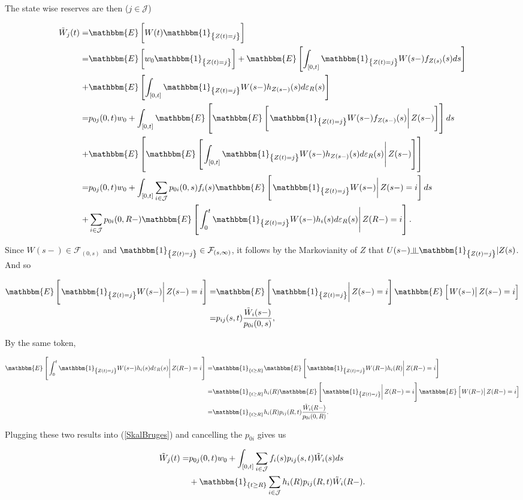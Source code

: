 \documentclass{book}
\newcommand{\indep}{\rotatebox[origin=c]{90}{$\models$}}
\newcommand{\1}[1]{\mathbbm{1}_{\left\lbrace #1 \right\rbrace}}
\newcommand{\expec}[1][def]{\mathbbm{E} \left[ #1 \right]}
\newcommand{\econd}[2][def]{\mathbbm{E} \left[ \left. #1 \right| #2 \right]}
\theoremstyle{break}
\theoremstyle{remark}
\numberwithin{equation}{section}
\begin{document}
The state wise reserves are then ($j \in \mathcal{J}$)

\begin{align} \label{SkalBruges}
	\tilde{W}_j(t) =& \expec[W(t) \1{Z(t)=j}] \nonumber \\
	=& \expec[w_0 \1{Z(t)=j}] + \expec[\int_{\left[ 0,t \right]} \1{Z(t)=j} W(s-) f_{Z(s)}(s) ds] \nonumber \\
	+& \expec[\int_{\left[ 0,t \right]} \1{Z(t)=j} W(s-) h_{Z(s-)}(s) d \varepsilon_{R}(s)] \nonumber \\
	=& p_{0j}(0,t) w_0 + \int_{\left[ 0,t \right]} \mathbbm{E} \left[ \econd[\1{Z(t)=j} W(s-) f_{Z(s-)}(s)]{Z(s-)} \right]ds \nonumber \\
	+& \mathbbm{E} \left[ \econd[ \int_{\left[ 0,t \right]} \1{Z(t)=j} W(s-) h_{Z(s-)}(s) d \varepsilon_{R}(s) ]{Z(s-)} \right] \nonumber \\
	=& p_{0j}(0,t) w_0 + \int_{\left[ 0,t \right]} \sum_{i \in \mathcal{J}} p_{0i}(0,s) f_{i}(s) \econd[\1{Z(t)=j} W(s-)]{Z(s-)=i} ds \\
	+& \sum_{i \in \mathcal{J}} p_{0i}(0,R-) \econd[\int_0^t \1{Z(t)=j} W(s-) h_{i}(s) d \varepsilon_{R}(s)]{Z(R-)=i}. \nonumber
\end{align}

Since $W(s-) \in  \mathcal{F}_{\left( 0,s \right)}$ and $\1{Z(t)=j} \in \mathcal{F}_{\left( s,\infty \right)}$, it follows by the Markovianity of $Z$ that $U(s-) \indep \1{Z(t)=j} | Z(s)$. And so 

\begin{align*}
	\econd[\1{Z(t)=j}W(s-)]{Z(s-)=i} =& \econd[\1{Z(t)=j}]{Z(s-)=i} \econd[W(s-)]{Z(s-)=i} \\
	=& p_{ij}(s,t) \frac{\tilde{W}_i(s-)}{p_{0i}(0,s)},
\end{align*}

By the same token,

\begin{align*}
	\econd[\int_0^t \1{Z(t)=j} W(s-) h_{i}(s) d \varepsilon_{R}(s)]{Z(R-)=i} =& \1{t \geq R} \econd[\1{Z(t)=j} W(R-) h_{i}(R)]{Z(R-)=i} \\
	=& \1{t \geq R} h_{i}(R) \econd[\1{Z(t)=j}]{Z(R-)=i} \econd[W(R-)]{Z(R-)=i} \\
	=& \1{t \geq R} h_{i}(R) p_{ij}(R,t) \frac{\tilde{W}_i(R-)}{p_{0i}(0,R)}.
\end{align*}

Plugging these two results into (\ref{SkalBruges}) and cancelling the $p_{0i}$ gives us

\begin{align} \label{Brug}
\begin{split}
		\tilde{W}_j(t) =& p_{0j}(0,t) w_0 + \int_{\left[ 0,t \right]} \sum_{i \in \mathcal{J}} f_{i}(s) p_{ij}(s,t) \tilde{W}_i(s) ds \\
	&+ \1{t \geq R} \sum_{i \in \mathcal{J}} h_{i}(R) p_{ij}(R,t) \tilde{W}_i(R-).
\end{split}
\end{align}
\end{document}
